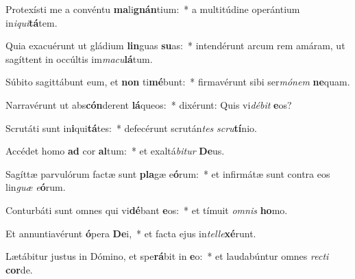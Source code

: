 \item Protexísti me a convéntu \textbf{ma}li\textbf{gnán}tium:~* a multitúdine operántium in\textit{i}\textit{qui}\textbf{tá}tem.
\item Quia exacuérunt ut gládium \textbf{lin}guas \textbf{su}as:~* intendérunt arcum rem amáram, ut sagíttent in occúltis im\textit{ma}\textit{cu}\textbf{lá}tum.
\item Súbito sagittábunt eum, et \textbf{non} ti\textbf{mé}bunt:~* firmavérunt sibi ser\textit{mó}\textit{nem} \textbf{ne}quam.
\item Narravérunt ut abs\textbf{cón}derent \textbf{lá}queos:~* dixérunt: Quis vi\textit{dé}\textit{bit} \textbf{e}os?
\item Scrutáti sunt in\textbf{i}qui\textbf{tá}tes:~* defecérunt scrután\textit{tes} \textit{scru}\textbf{tí}nio.
\item Accédet homo \textbf{ad} cor \textbf{al}tum:~* et exaltá\textit{bi}\textit{tur} \textbf{De}us.
\item Sagíttæ parvulórum factæ sunt \textbf{pla}gæ e\textbf{ó}rum:~* et infirmátæ sunt contra eos lin\textit{guæ} \textit{e}\textbf{ó}rum.
\item Conturbáti sunt omnes qui vi\textbf{dé}bant \textbf{e}os:~* et tímuit \textit{om}\textit{nis} \textbf{ho}mo.
\item Et annuntiavérunt \textbf{ó}pera \textbf{De}i,~* et facta ejus in\textit{tel}\textit{le}\textbf{xé}runt.
\item Lætábitur justus in Dómino, et spe\textbf{rá}bit in \textbf{e}o:~* et laudabúntur omnes \textit{rec}\textit{ti} \textbf{cor}de.
